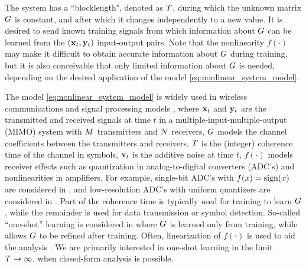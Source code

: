 \documentclass[12pt, draftclsnofoot,journal,onecolumn]{IEEEtran}
\begin{document}
The system has a ``blocklength", denoted as $T$, during which the unknown matrix $G$ is constant, and after which it changes independently to a new value. It is desired to send known training signals from which information about $G$ can be learned from the $({\mathbf{x}}_t,{\mathbf{y}}_t)$ input-output pairs.  Note that the nonlinearity $f(\cdot)$ may make it difficult to obtain accurate information about $G$ during training, but it is also conceivable that only limited information about $G$ is needed, depending on the desired application of the model \eqref{eq:nonlinear_system_model}.

The model \eqref{eq:nonlinear_system_model} is widely used in wireless communications and signal processing models \cite{hassibi2003much,li2016much,li2017channel,takeuchi2010achievable,takeuchi2012large,takeuchi2013achievable,wen2015performance,wen2015joint,wen2016bayes,estes2020efficient}, where ${\mathbf{x}}_t$ and ${\mathbf{y}}_t$ are the transmitted and received signals at time $t$ in a multiple-input-multiple-output (MIMO) system with $M$ transmitters and $N$ receivers, $G$ models the channel coefficients between the transmitters and receivers, $T$ is the (integer) coherence time of the channel in symbols, ${\mathbf{v}}_t$ is the additive noise at time $t$, $f(\cdot)$ models receiver effects such as quantization in analog-to-digital converters (ADC's) and nonlinearities in amplifiers.  
For example, single-bit ADC's with $f(x)=\text{sign}(x)$ are considered in \cite{li2016much,li2017channel}, and low-resolution ADC's with uniform quantizers are considered in \cite{wen2015joint,wen2016bayes}. Part of the coherence time is typically used for training to learn $G$, while the remainder is used for data transmission or symbol detection. So-called ``one-shot'' learning is considered in \cite{hassibi2003much,li2016much,li2017channel} where $G$ is learned only from training, while \cite{takeuchi2010achievable,takeuchi2012large,takeuchi2013achievable,wen2015performance,wen2015joint,wen2016bayes} allows $G$ to be refined after training. 
Often, linearization of $f(\cdot)$ is used to aid the analysis \cite{li2016much,li2017channel}.  We are primarily interested in one-shot learning in the limit $T\to\infty$, when closed-form analysis is possible.
\end{document}
